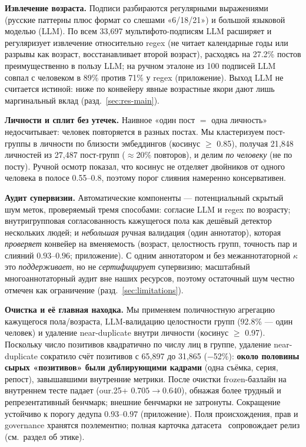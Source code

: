 \documentclass[10pt,twocolumn,letterpaper]{article}
\begin{document}
\textbf{Извлечение возраста.} Подписи разбираются регулярными выражениями (русские паттерны плюс формат
со слешами «6/18/21») и большой языковой моделью (LLM). По всем 33{,}697 мультифото-подписям LLM
расширяет и регуляризует извлечение относительно regex (не читает календарные годы или разрывы как
возраст, восстанавливает второй возраст), расходясь на 27.2\% постов преимущественно в пользу LLM; на
ручном эталоне из 100 подписей LLM совпал с человеком в 89\% против 71\% у regex (приложение). Выход LLM
не считается истиной: ниже по конвейеру явные возрастные якори дают лишь маргинальный вклад
(разд.~\ref{sec:res-main}).

\textbf{Личности и сплит без утечек.} Наивное «один пост $=$ одна личность» недосчитывает: человек
повторяется в разных постах. Мы кластеризуем пост-группы в личности по близости эмбеддингов (косинус
$\geq$ 0.85), получая 21{,}848 личностей из 27{,}487 пост-групп ($\approx$20\% повторов), и делим
\emph{по человеку} (не по посту). Ручной осмотр показал, что косинус не отделяет двойников от одного
человека в полосе 0.55--0.8, поэтому порог слияния намеренно консервативен.

\textbf{Аудит супервизии.} Автоматические компоненты — потенциальный скрытый шум меток, проверяемый
тремя способами: согласие LLM и regex по возрасту; внутригрупповая согласованность кажущегося пола как
дешёвый детектор нескольких людей; и \emph{небольшая} ручная валидация (один аннотатор), которая
\emph{проверяет} конвейер на вменяемость (возраст, целостность групп, точность пар и слияний $0.93$--$0.96$;
приложение). С одним аннотатором и без межаннотаторной $\kappa$ это \emph{поддерживает}, но не
\emph{сертифицирует} супервизию; масштабный многоаннотаторный аудит вне наших ресурсов, поэтому
остаточный шум честно отмечен как ограничение (разд.~\ref{sec:limitations}).

\textbf{Очистка и её главная находка.} Мы применяем поличностную агрегацию кажущегося пола/возраста,
LLM-валидацию целостности групп (92.8\% — один человек) и удаление near-duplicate внутри личности
(косинус $\geq$ 0.97). Поскольку число позитивов квадратично по числу лиц в группе, удаление
near-duplicate сократило счёт позитивов с 65{,}897 до 31{,}865 ($-$52\%): \textbf{около половины сырых
«позитивов» были дублирующими кадрами} (одна съёмка, серия, репост), завышавшими внутренние метрики.
После очистки frozen-базлайн на внутреннем тесте падает (our.25+ $0.705\!\rightarrow\!0.640$), обнажая
более трудный и репрезентативный бенчмарк; внешние бенчмарки не затронуты. Сокращение устойчиво к порогу
дедупа $0.93$--$0.97$ (приложение). Поля происхождения, прав и governance хранятся поэлементно; полная
карточка датасета~\cite{gebru2021datasheets} сопровождает релиз (см.\ раздел об этике).
\end{document}
